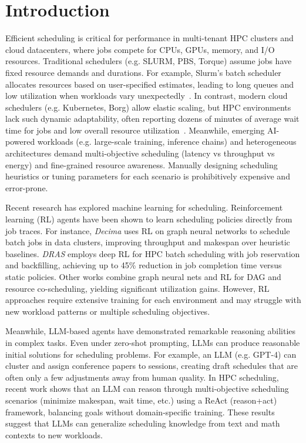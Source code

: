 \section{Introduction}

Efficient scheduling is critical for performance in multi-tenant HPC clusters and cloud datacenters, where jobs compete for CPUs, GPUs, memory, and I/O resources. Traditional schedulers (e.g. SLURM, PBS, Torque) assume jobs have fixed resource demands and durations. For example, Slurm's batch scheduler allocates resources based on user-specified estimates, leading to long queues and low utilization when workloads vary unexpectedly~\cite{arxiv2401}. In contrast, modern cloud schedulers (e.g. Kubernetes, Borg) allow elastic scaling, but HPC environments lack such dynamic adaptability, often reporting dozens of minutes of average wait time for jobs and low overall resource utilization~\cite{arxiv2401}. Meanwhile, emerging AI-powered workloads (e.g. large-scale training, inference chains) and heterogeneous architectures demand multi-objective scheduling (latency vs throughput vs energy) and fine-grained resource awareness. Manually designing scheduling heuristics or tuning parameters for each scenario is prohibitively expensive and error-prone.

Recent research has explored machine learning for scheduling. Reinforcement learning (RL) agents have been shown to learn scheduling policies directly from job traces. For instance, \emph{Decima} uses RL on graph neural networks to schedule batch jobs in data clusters, improving throughput and makespan over heuristic baselines. \emph{DRAS} employs deep RL for HPC batch scheduling with job reservation and backfilling, achieving up to 45\% reduction in job completion time versus static policies. Other works combine graph neural nets and RL for DAG and resource co-scheduling, yielding significant utilization gains. However, RL approaches require extensive training for each environment and may struggle with new workload patterns or multiple scheduling objectives.

Meanwhile, LLM-based agents have demonstrated remarkable reasoning abilities in complex tasks. Even under zero-shot prompting, LLMs can produce reasonable initial solutions for scheduling problems. For example, an LLM (e.g. GPT-4) can cluster and assign conference papers to sessions, creating draft schedules that are often only a few adjustments away from human quality. In HPC scheduling, recent work shows that an LLM can reason through multi-objective scheduling scenarios (minimize makespan, wait time, etc.) using a ReAct (reason+act) framework, balancing goals without domain-specific training. These results suggest that LLMs can generalize scheduling knowledge from text and math contexts to new workloads.

